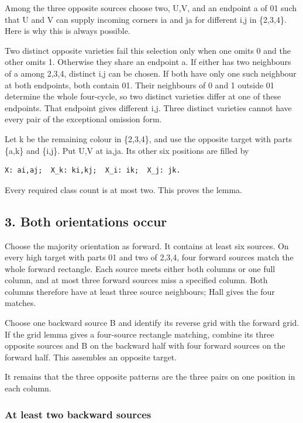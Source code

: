\documentclass[
  10pt,
]{article}
\begin{document}
Among the three opposite sources choose two, U,V, and an endpoint a of
01 such that U and V can supply incoming corners ia and ja for different
i,j in \{2,3,4\}. Here is why this is always possible.

Two distinct opposite varieties fail this selection only when one omits
0 and the other omits 1. Otherwise they share an endpoint a. If either
has two neighbours of a among 2,3,4, distinct i,j can be chosen. If both
have only one such neighbour at both endpoints, both contain 01. Their
neighbours of 0 and 1 outside 01 determine the whole four-cycle, so two
distinct varieties differ at one of these endpoints. That endpoint gives
different i,j. Three distinct varieties cannot have every pair of the
exceptional omission form.

Let k be the remaining colour in \{2,3,4\}, and use the opposite target
with parts \{a,k\} and \{i,j\}. Put U,V at ia,ja. Its other six
positions are filled by

\begin{verbatim}
X: ai,aj;  X_k: ki,kj;  X_i: ik;  X_j: jk.
\end{verbatim}

Every required class count is at most two. This proves the lemma.

\hypertarget{both-orientations-occur}{%
\subsection*{3. Both orientations occur}\label{both-orientations-occur}}

Choose the majority orientation as forward. It contains at least six
sources. On every high target with parts 01 and two of 2,3,4, four
forward sources match the whole forward rectangle. Each source meets
either both columns or one full column, and at most three forward
sources miss a specified column. Both columns therefore have at least
three source neighbours; Hall gives the four matches.

Choose one backward source B and identify its reverse grid with the
forward grid. If the grid lemma gives a four-source rectangle matching,
combine its three opposite sources and B on the backward half with four
forward sources on the forward half. This assembles an opposite target.

It remains that the three opposite patterns are the three pairs on one
position in each column.

\hypertarget{at-least-two-backward-sources}{%
\subsubsection*{At least two backward
sources}\label{at-least-two-backward-sources}}
\end{document}

